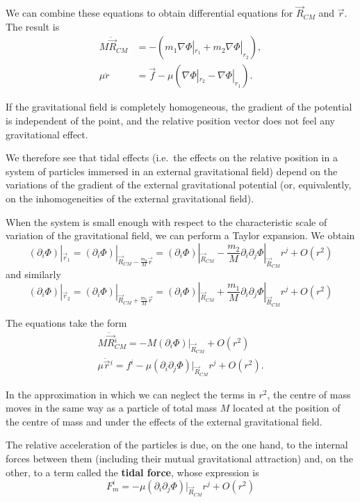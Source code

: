\begin{points}
\item We can combine these equations to obtain differential equations for $\vec R_{CM}$ and $\vec r$. The result is
\begin{align}
  M\ddot{\vec R}_{CM}&=-\left(m_1\nabla\Phi|_{r_1}+m_2\nabla\Phi|_{r_2}\right),\\
  \mu\ddot r&=\vec f-\mu\left(\nabla\Phi|_{r_2}-\nabla\Phi|_{r_1}\right).
\end{align}

\item If the gravitational field is completely homogeneous, the gradient of the potential is independent of the point, and the relative position vector does not feel any gravitational effect.

\item We therefore see that tidal effects (i.e.\ the effects on the relative position in a system of particles immersed in an external gravitational field) depend on the variations of the gradient of the external gravitational potential (or, equivalently, on the inhomogeneities of the external gravitational field).

\item When the system is small enough with respect to the characteristic scale of variation of the gravitational field, we can perform a Taylor expansion. We obtain
\[
  (\partial_i\Phi)|_{\vec r_1}=(\partial_i\Phi)|_{\vec R_{CM}-\frac{m_2}{M}\vec r}=(\partial_i\Phi)|_{\vec R_{CM}}-\frac{m_2}{M}\partial_i\partial_j\Phi|_{\vec R_{CM}}r^j+O(r^2)
\]
and similarly
\[
  (\partial_i\Phi)|_{\vec r_2}=(\partial_i\Phi)|_{\vec R_{CM}+\frac{m_1}{M}\vec r}=(\partial_i\Phi)|_{\vec R_{CM}}+\frac{m_1}{M}\partial_i\partial_j\Phi|_{\vec R_{CM}}r^j+O(r^2)
\]

\item The equations take the form
\begin{gather*}
  M\ddot{\vec R}{}^i_{CM}=-M(\partial_i\Phi)|_{\vec R_{CM}}+O(r^2)\\
  \mu\ddot{\vec r}{}^i=f^i-\mu(\partial_i\partial_j\Phi)|_{\vec R_{CM}}r^j+O(r^2).
\end{gather*}

\item In the approximation in which we can neglect the terms in $r^2$, the centre of mass moves in the same way as a particle of total mass $M$ located at the position of the centre of mass and under the effects of the external gravitational field.

\item The relative acceleration of the particles is due, on the one hand, to the internal forces between them (including their mutual gravitational attraction) and, on the other, to a term called the \textbf{tidal force}, whose expression is
\[
  F^i_m=-\mu(\partial_i\partial_j\Phi)|_{\vec R_{CM}}r^j+O(r^2)
\]


\end{points}
